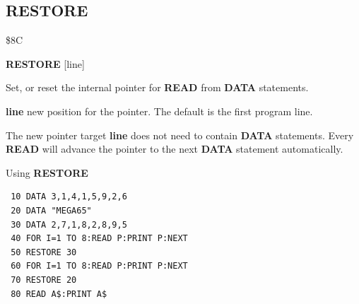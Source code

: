 
\newpage
\subsection{RESTORE}
\begin{description}[leftmargin=2cm,style=nextline]
\item [Token:] \$8C
\item [Format:] {\bf RESTORE} [line]
\item [Usage:]  Set, or reset the internal pointer for
                {\bf READ} from {\bf DATA} statements.

                {\bf line} new position for the
                pointer. The default is the
                first program line.

\item [Remarks:] The new pointer target {\bf line}
                 does not need to contain {\bf DATA} statements.
                 Every {\bf READ} will advance
                 the pointer to the next {\bf DATA} statement automatically.
\item [Example:] Using {\bf RESTORE}

\begin{tcolorbox}[colback=black,coltext=white]
\verbatimfont{\codefont}
\begin{verbatim}
 10 DATA 3,1,4,1,5,9,2,6
 20 DATA "MEGA65"
 30 DATA 2,7,1,8,2,8,9,5
 40 FOR I=1 TO 8:READ P:PRINT P:NEXT
 50 RESTORE 30
 60 FOR I=1 TO 8:READ P:PRINT P:NEXT
 70 RESTORE 20
 80 READ A$:PRINT A$
\end{verbatim}
\end{tcolorbox}
\end{description}


\newpage
